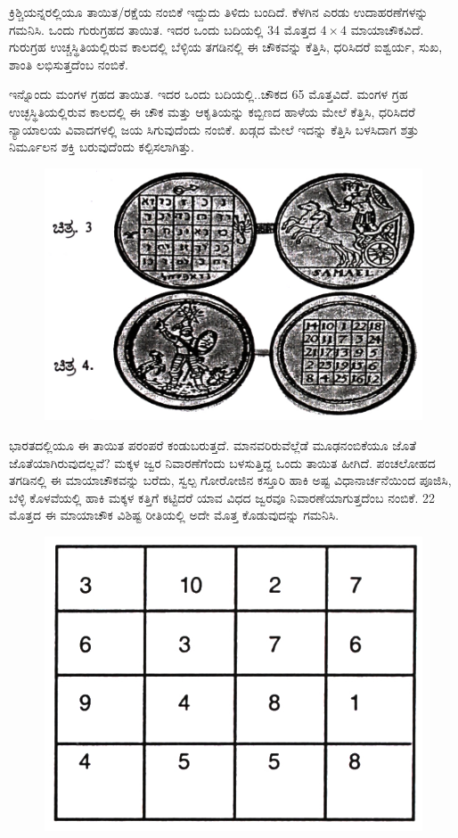 ಕ್ರಿಶ್ಚಿಯನ್ನರಲ್ಲಿಯೂ ತಾಯಿತ/ರಕ್ಷೆಯ ನಂಬಿಕೆ ಇದ್ದುದು ತಿಳಿದು ಬಂದಿದೆ. ಕೆಳಗಿನ ಎರಡು ಉದಾಹರಣೆಗಳನ್ನು ಗಮನಿಸಿ. ಒಂದು ಗುರುಗ್ರಹದ ತಾಯಿತ. ಇದರ ಒಂದು ಬದಿಯಲ್ಲಿ 34 ಮೊತ್ತದ $4 \times 4$ ಮಾಯಾಚೌಕವಿದೆ. ಗುರುಗ್ರಹ ಉಚ್ಚಸ್ಥಿತಿಯಲ್ಲಿರುವ ಕಾಲದಲ್ಲಿ ಬೆಳ್ಳಿಯ ತಗಡಿನಲ್ಲಿ ಈ ಚೌಕವನ್ನು ಕೆತ್ತಿಸಿ, ಧರಿಸಿದರೆ ಐಶ್ವರ್ಯ, ಸುಖ, ಶಾಂತಿ ಲಭಿಸುತ್ತದೆಂಬ ನಂಬಿಕೆ.

ಇನ್ನೊಂದು ಮಂಗಳ ಗ್ರಹದ ತಾಯಿತ. ಇದರ ಒಂದು ಬದಿಯಲ್ಲಿ..ಚೌಕದ 65 ಮೊತ್ತವಿದೆ. ಮಂಗಳ ಗ್ರಹ ಉಚ್ಛಸ್ಥಿತಿಯಲ್ಲಿರುವ ಕಾಲದಲ್ಲಿ ಈ ಚೌಕ ಮತ್ತು ಆಕೃತಿಯನ್ನು ಕಬ್ಬಿಣದ ಹಾಳೆಯ ಮೇಲೆ ಕೆತ್ತಿಸಿ, ಧರಿಸಿದರೆ ನ್ಯಾಯಾಲಯ ವಿವಾದಗಳಲ್ಲಿ ಜಯ ಸಿಗುವುದೆಂದು ನಂಬಿಕೆ. ಖಡ್ಗದ ಮೇಲೆ ಇದನ್ನು ಕೆತ್ತಿಸಿ ಬಳಸಿದಾಗ ಶತ್ರು ನಿರ್ಮೂಲನ ಶಕ್ತಿ ಬರುವುದೆಂದು ಕಲ್ಪಿಸಲಾಗಿತ್ತು.
\begin{figure}[H]
\includegraphics{src/figures/chap11/fig11.2.jpg}
\end{figure}

ಭಾರತದಲ್ಲಿಯೂ ಈ ತಾಯಿತ ಪರಂಪರೆ ಕಂಡುಬರುತ್ತದೆ. ಮಾನವರಿರುವೆಲ್ಲೆಡೆ ಮೂಢನಂಬಿಕೆಯೂ ಜೊತೆ ಜೊತೆಯಾಗಿರುವುದಲ್ಲವೆ? ಮಕ್ಕಳ ಜ್ವರ ನಿವಾರಣೆಗೆಂದು ಬಳಸುತ್ತಿದ್ದ ಒಂದು ತಾಯಿತ ಹೀಗಿದೆ. ಪಂಚಲೋಹದ ತಗಡಿನಲ್ಲಿ ಈ ಮಾಯಾಚೌಕವನ್ನು ಬರೆದು, ಸ್ವಲ್ಪ ಗೋರೋಜಿನ ಕಸ್ತೂರಿ ಹಾಕಿ ಅಷ್ಟ ವಿಧಾನಾರ್ಚನೆಯಿಂದ ಪೂಜಿಸಿ, ಬೆಳ್ಳಿ ಕೊಳವೆಯಲ್ಲಿ ಹಾಕಿ ಮಕ್ಕಳ ಕತ್ತಿಗೆ ಕಟ್ಟಿದರೆ ಯಾವ ವಿಧದ ಜ್ವರವೂ ನಿವಾರಣೆಯಾಗುತ್ತದೆಂಬ ನಂಬಿಕೆ. 22 ಮೊತ್ತದ ಈ ಮಾಯಾಚೌಕ ವಿಶಿಷ್ಟ ರೀತಿಯಲ್ಲಿ ಅದೇ ಮೊತ್ತ ಕೊಡುವುದನ್ನು ಗಮನಿಸಿ.
\begin{figure}[H]
\includegraphics{src/figures/chap11/fig11.3.jpg}
\end{figure}

